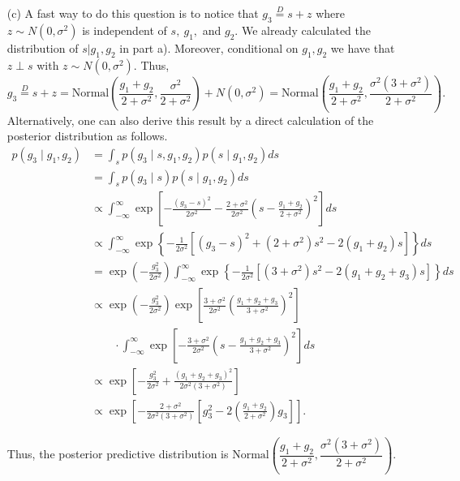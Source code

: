 \begin{enumerate}
\item[(c)] A fast way to do this question is to notice that $g_3 \stackrel{D}{=} s+z$ where $z \sim N(0,\sigma^2)$ is independent of $s,\ g_1,$ and $g_2$. We already  calculated the distribution of $s|g_1,g_2$ in part a). Moreover, conditional on $g_1,g_2$ we have that $z \perp s$ with $z \sim N(0,\sigma^2)$. Thus,
\[
g_3 \stackrel{D}{=} s+z =\text{Normal}\left( \dfrac{g_1 + g_2}{2 + \sigma^2}, \dfrac{\sigma^2}{2 + \sigma^2} \right) + N(0,\sigma^2) = \text{Normal}\left( \dfrac{g_1 + g_2}{2 + \sigma^2}, \dfrac{\sigma^2(3+\sigma^2)}{2 + \sigma^2} \right).
\]
Alternatively, one can also derive this result by a direct calculation of the posterior distribution as follows.
\begin{align*}
p(g_3 \mid g_1, g_2) &= \int_s p(g_3 \mid s, g_1, g_2) p(s \mid g_1, g_2) ds \\ 
&= \int_s p(g_3 \mid s) p(s \mid g_1, g_2) ds \\ 
&\propto \int_{-\infty}^\infty \exp \left[ - \frac{(g_3 - s)^2}{2 \sigma^2} - \frac{2+\sigma^2}{2\sigma^2} \left( s - \frac{g_1 + g_2}{2 + \sigma^2} \right)^2 \right] ds \\ 
&\propto \int_{-\infty}^\infty \exp \left\{ -\frac{1}{2\sigma^2} \left[ (g_3 - s)^2 + (2 + \sigma^2)s^2 - 2 (g_1 + g_2)s \right] \right\} ds \\ 
&= \exp \left( - \frac{g_3^2}{2\sigma^2} \right) \int_{-\infty}^\infty \exp \left\{ -\frac{1}{2\sigma^2} \left[ (3 + \sigma^2)s^2 - 2(g_1 + g_2 + g_3)s \right] \right\} ds \\ 
&\propto \exp \left( - \frac{g_3^2}{2\sigma^2} \right) \exp \left[ \frac{3 + \sigma^2}{2\sigma^2} \left( \frac{g_1 + g_2 + g_3}{3 + \sigma^2} \right)^2 \right]  \\ &\qquad \cdot \int_{-\infty}^\infty \exp \left[ -\frac{3 + \sigma^2}{2\sigma^2} \left( s - \frac{g_1 + g_2 + g_3}{3 + \sigma^2} \right)^2 \right] ds \\ 
&\propto \exp \left[ - \frac{g_3^2}{2\sigma^2} + \frac{(g_1 + g_2 + g_3)^2}{2\sigma^2(3 + \sigma^2)} \right] \\ 
&\propto \exp \left[ - \frac{2 + \sigma^2}{2\sigma^2 (3 +\sigma^2)} \left[ g_3^2 - 2\left( \frac{g_1 + g_2}{2 + \sigma^2}\right) g_3 \right] \right].
\end{align*}

Thus, the posterior predictive distribution is $\text{Normal}\left( \dfrac{g_1 + g_2}{2 + \sigma^2}, \dfrac{\sigma^2(3 + \sigma^2)}{2 + \sigma^2} \right)$.


\end{enumerate}
